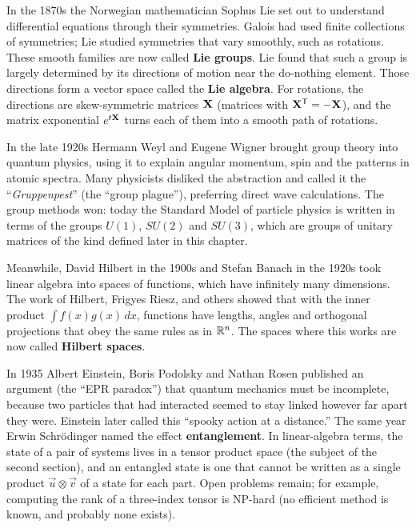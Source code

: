\begin{historybox}
In the 1870s the Norwegian mathematician Sophus Lie set out to understand differential equations through their symmetries. Galois had used finite collections of symmetries; Lie studied symmetries that vary smoothly, such as rotations. These smooth families are now called \textbf{Lie groups}. Lie found that such a group is largely determined by its directions of motion near the do-nothing element. Those directions form a vector space called the \textbf{Lie algebra}. For rotations, the directions are skew-symmetric matrices $\mathbf{X}$ (matrices with $\mathbf{X}^{\mathsf{T}}=-\mathbf{X}$), and the matrix exponential $e^{t\mathbf{X}}$ turns each of them into a smooth path of rotations.

In the late 1920s Hermann Weyl and Eugene Wigner brought group theory into quantum physics, using it to explain angular momentum, spin and the patterns in atomic spectra. Many physicists disliked the abstraction and called it the ``\emph{Gruppenpest}'' (the ``group plague''), preferring direct wave calculations. The group methods won: today the Standard Model of particle physics is written in terms of the groups $U(1)$, $SU(2)$ and $SU(3)$, which are groups of unitary matrices of the kind defined later in this chapter.

Meanwhile, David Hilbert in the 1900s and Stefan Banach in the 1920s took linear algebra into spaces of functions, which have infinitely many dimensions. The work of Hilbert, Frigyes Riesz, and others showed that with the inner product $\int f(x)g(x)\,dx$, functions have lengths, angles and orthogonal projections that obey the same rules as in $\mathbb{R}^n$. The spaces where this works are now called \textbf{Hilbert spaces}.

In 1935 Albert Einstein, Boris Podolsky and Nathan Rosen published an argument (the ``EPR paradox'') that quantum mechanics must be incomplete, because two particles that had interacted seemed to stay linked however far apart they were. Einstein later called this ``spooky action at a distance.'' The same year Erwin Schr\"odinger named the effect \textbf{entanglement}. In linear-algebra terms, the state of a pair of systems lives in a tensor product space (the subject of the second section), and an entangled state is one that cannot be written as a single product $\vec{u}\otimes\vec{v}$ of a state for each part. Open problems remain; for example, computing the rank of a three-index tensor is NP-hard (no efficient method is known, and probably none exists).
\end{historybox}

